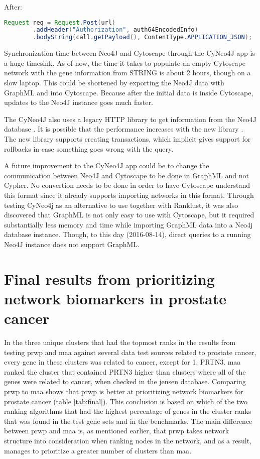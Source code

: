After:
\begin{lstlisting}[frame=single,language=Java]
Request req = Request.Post(url)
        .addHeader("Authorization", auth64EncodedInfo)
        .bodyString(call.getPayload(), ContentType.APPLICATION_JSON);
\end{lstlisting}

Synchronization time between Neo4J and Cytoscape through the CyNeo4J app is a
huge timesink. As of now, the time it takes to populate an empty Cytoscape
network with the gene information from STRING is about 2 hours, though on a slow
laptop. This could be shortened by exporting the Neo4J data with GraphML and
into Cytoscape. Because after the initial data is inside Cytoscape, updates to
the Neo4J instance goes much faster.

The CyNeo4J also uses a legacy HTTP library to get information from the Neo4J
database \cite{legacy-neo4j}. It is possible that the performance increases with
the new library \cite{transactional-neo4j}. The new library supports creating
transactions, which implicit gives support for rollbacks in case something goes
wrong with the query.

A future improvement to the CyNeo4J app could be to change the communication
between Neo4J and Cytoscape to be done in GraphML and not Cypher. No convertion
needs to be done in order to have Cytoscape understand this format since it
already supports importing networks in this format. Through testing CyNeo4j as
an alternative to use together with Ranklust, it was also discovered that
GraphML is not only easy to use with Cytoscape, but it required substantially
less memory and time while importing GraphML data into a Neo4j database
instance. Though, to this day (2016-08-14), direct queries to a running Neo4J
instance does not support GraphML.

\section{Final results from prioritizing network biomarkers in prostate cancer}
In the three unique clusters that had the topmost ranks in the results from
testing \gls{prwp} and \gls{maa} against several data test sources related to
prostate cancer, every gene in these clusters was related to cancer, except for
1, PRTN3. \gls{maa} ranked the cluster that contained PRTN3 higher than clusters
where all of the genes were related to cancer, when checked in the \gls{jensen}
database. Comparing \gls{prwp} to \gls{maa} shows that \gls{prwp} is
better at prioritizing network biomarkers for prostate cancer
(table \ref{tab:final}). This conclusion is based on which of the two ranking
algorithms that had the highest percentage of genes in the cluster ranks that
was found in the test gene sets and in the benchmarks. The main difference
between \gls{prwp} and \gls{maa} is, as mentioned earlier, that \gls{prwp} takes
network structure into consideration when ranking nodes in the network, and as a
result, manages to prioritize a greater number of clusters than \gls{maa}.
